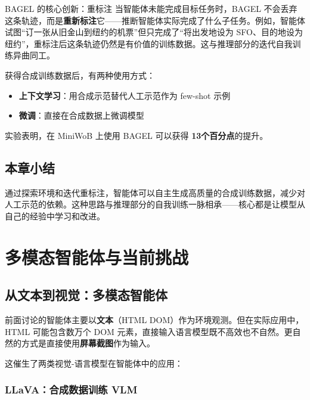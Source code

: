 \documentclass[a4paper]{article}
\begin{document}



\begin{importantbox}{BAGEL 的核心创新：重标注}
当智能体未能完成目标任务时，BAGEL 不会丢弃这条轨迹，而是\textbf{重新标注}它——推断智能体实际完成了什么子任务。例如，智能体试图``订一张从旧金山到纽约的机票''但只完成了``将出发地设为 SFO、目的地设为纽约''，重标注后这条轨迹仍然是有价值的训练数据。这与推理部分的迭代自我训练异曲同工。
\end{importantbox}

获得合成训练数据后，有两种使用方式：

\begin{itemize}
    \item \textbf{上下文学习}：用合成示范替代人工示范作为 few-shot 示例
    \item \textbf{微调}：直接在合成数据上微调模型
\end{itemize}

实验表明，在 MiniWoB 上使用 BAGEL 可以获得 \textbf{13个百分点}的提升。

\subsection{本章小结}

通过探索环境和迭代重标注，智能体可以自主生成高质量的合成训练数据，减少对人工示范的依赖。这种思路与推理部分的自我训练一脉相承——核心都是让模型从自己的经验中学习和改进。


\section{多模态智能体与当前挑战}

\subsection{从文本到视觉：多模态智能体}

前面讨论的智能体主要以\textbf{文本}（HTML DOM）作为环境观测。但在实际应用中，HTML 可能包含数万个 DOM 元素，直接输入语言模型既不高效也不自然。更自然的方式是直接使用\textbf{屏幕截图}作为输入。

这催生了两类视觉-语言模型在智能体中的应用：

\subsubsection{LLaVA：合成数据训练 VLM}
\end{document}
